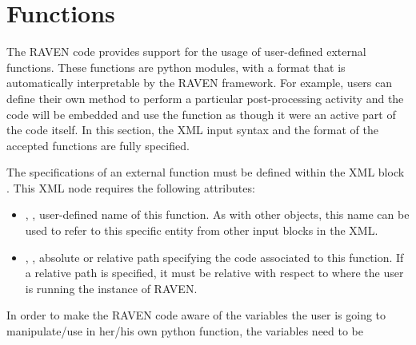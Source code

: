 \section{Functions } 
\label{sec:functions}

The RAVEN code provides support for the usage of user-defined external
functions.
%
These functions are python modules, with a format that is automatically
interpretable by the RAVEN framework.
%
For example, users can define their own method to perform a particular
post-processing activity and the code will be embedded and use the function as
though it were an active part of the code itself.
%
In this section, the XML input syntax and the format of the accepted functions 
are fully specified.

The specifications of an external function must be defined within the XML block
. This XML node requires the following attributes:
\vspace{-5mm}
\begin{itemize}
\itemsep0em
\item {}, , user-defined name of
this function. 
\nb As with other objects, this name can be used to refer to this
specific entity from other input blocks in the XML.
\item {}, , absolute or
relative path specifying the code associated to this function.
\nb If a relative path is specified, it must be relative with respect
to where the user is running the instance of RAVEN.
\end{itemize}
\vspace{-5mm}
In order to make the RAVEN code aware of the variables the user is going to
manipulate/use in her/his own python function, the variables need to be
